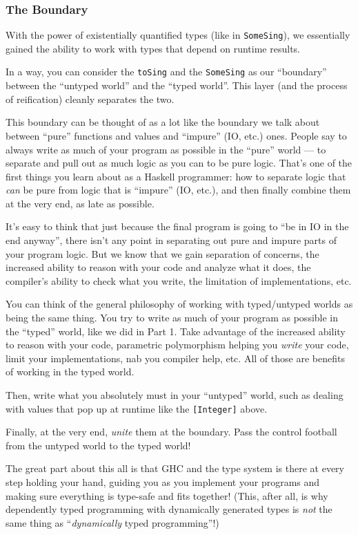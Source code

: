 \documentclass[]{article}
\begin{document}
\hypertarget{the-boundary}{%
\subsubsection{The Boundary}\label{the-boundary}}

With the power of existentially quantified types (like in \texttt{SomeSing}), we
essentially gained the ability to work with types that depend on runtime
results.

In a way, you can consider the \texttt{toSing} and the \texttt{SomeSing} as our
``boundary'' between the ``untyped world'' and the ``typed world''. This layer
(and the process of reification) cleanly separates the two.

This boundary can be thought of as a lot like the boundary we talk about between
``pure'' functions and values and ``impure'' (IO, etc.) ones. People say to
always write as much of your program as possible in the ``pure'' world --- to
separate and pull out as much logic as you can to be pure logic. That's one of
the first things you learn about as a Haskell programmer: how to separate logic
that \emph{can} be pure from logic that is ``impure'' (IO, etc.), and then
finally combine them at the very end, as late as possible.

It's easy to think that just because the final program is going to ``be in IO in
the end anyway'', there isn't any point in separating out pure and impure parts
of your program logic. But we know that we gain separation of concerns, the
increased ability to reason with your code and analyze what it does, the
compiler's ability to check what you write, the limitation of implementations,
etc.

You can think of the general philosophy of working with typed/untyped worlds as
being the same thing. You try to write as much of your program as possible in
the ``typed'' world, like we did in Part 1. Take advantage of the increased
ability to reason with your code, parametric polymorphism helping you
\emph{write} your code, limit your implementations, nab you compiler help, etc.
All of those are benefits of working in the typed world.

Then, write what you absolutely must in your ``untyped'' world, such as dealing
with values that pop up at runtime like the \texttt{{[}Integer{]}} above.

Finally, at the very end, \emph{unite} them at the boundary. Pass the control
football from the untyped world to the typed world!

The great part about this all is that GHC and the type system is there at every
step holding your hand, guiding you as you implement your programs and making
sure everything is type-safe and fits together! (This, after all, is why
dependently typed programming with dynamically generated types is \emph{not} the
same thing as ``\emph{dynamically} typed programming''!)
\end{document}
